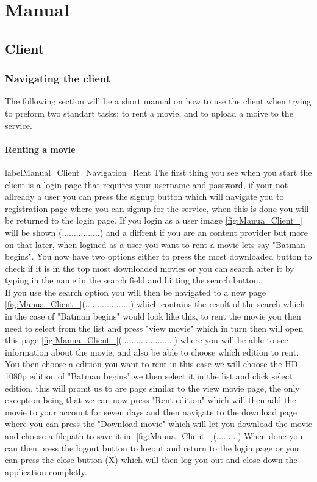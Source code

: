 \chapter{Manual}
\label{Manual}

\section{Client}
\label{Manual_Client}

\subsection{Navigating the client}
\label{Manual_Client_Navigation}
The following section will be a short manual on how to use the client when trying to preform two standart tasks: to rent a movie, and to upload a moive to the service.

\subsubsection{Renting a movie}
label{Manual_Client_Navigation_Rent}
The first thing you see when you start the client is a login page that requires your username and password, if your not allready a user you can press the signup button which will navigate you to registration page where you can signup for the service, when this is done you will be returned to the login page. If you login as a user image \ref{fig:Manua_Client_} will be shown (................) and a diffrent if you are an content provider but more on that later, when logined as a user you want to rent a movie lets say "Batman begins". You now have two options either to press the most downloaded button to check if it is in the top most downloaded movies or you can search after it by typing in the name in the search field and hitting the search button.
\\If you use the search option you will then be navigated to a new page \ref{fig:Manua_Client_}(...................) which contains the result of the search which in the case of "Batman begins" would look like this, to rent the movie you then need to select from the list and press "view movie" which in turn then will open this page \ref{fig:Manua_Client_}(......................) where you will be able to see information about the movie, and also be able to choose which edition to rent.
\\ You then choose a edition you want to rent in this case we will choose the HD 1080p edition of "Batman begins" we then select it in the list and click select edition, this will promt us to are page similar to the view movie page, the only exception being that we can now press "Rent edition" which will then add the movie to your account for seven days and then navigate to the download page where you can press the "Download movie" which will let you download the movie and choose a filepath to save it in. \ref{fig:Manua_Client_}(.........) When done you can then press the logout button to logout and return to the login page or you can press the close button (X) which will then log you out and close down the application completly.

